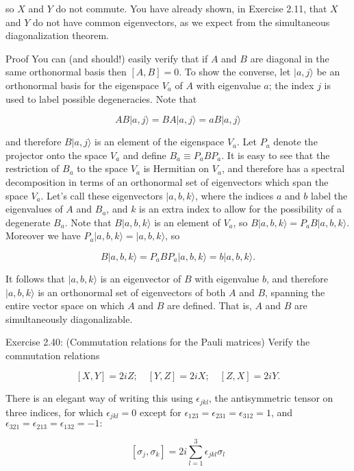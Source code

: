 \documentclass[
	11pt, %
	fleqn, %
	a4paper, %
]{LegrandOrangeBook}
\begin{document}
so $X$ and $Y$ do not commute. You have already shown, in Exercise 2.11, that $X$ and $Y$ do not have common eigenvectors, as we expect from the simultaneous diagonalization theorem.

Proof
You can (and should!) easily verify that if $A$ and $B$ are diagonal in the same orthonormal basis then $[A, B]=0$. To show the converse, let $|a, j\rangle$ be an orthonormal basis for the eigenspace $V_{a}$ of $A$ with eigenvalue $a$; the index $j$ is used to label possible degeneracies. Note that

$$
A B|a, j\rangle=B A|a, j\rangle=a B|a, j\rangle
$$

and therefore $B|a, j\rangle$ is an element of the eigenspace $V_{a}$. Let $P_{a}$ denote the projector onto the space $V_{a}$ and define $B_{a} \equiv P_{a} B P_{a}$. It is easy to see that the restriction of $B_{a}$ to the space $V_{a}$ is Hermitian on $V_{a}$, and therefore has a spectral decomposition in terms of an orthonormal set of eigenvectors which span the space $V_{a}$. Let's call these eigenvectors $|a, b, k\rangle$, where the indices $a$ and $b$ label the eigenvalues of $A$ and $B_{a}$, and $k$ is an extra index to allow for the possibility of a degenerate $B_{a}$. Note that $B|a, b, k\rangle$ is an element of $V_{a}$, so $B|a, b, k\rangle=P_{a} B|a, b, k\rangle$. Moreover we have $P_{a}|a, b, k\rangle=|a, b, k\rangle$, so

$$
B|a, b, k\rangle=P_{a} B P_{a}|a, b, k\rangle=b|a, b, k\rangle .
$$

It follows that $|a, b, k\rangle$ is an eigenvector of $B$ with eigenvalue $b$, and therefore $|a, b, k\rangle$ is an orthonormal set of eigenvectors of both $A$ and $B$, spanning the entire vector space on which $A$ and $B$ are defined. That is, $A$ and $B$ are simultaneously diagonalizable.

Exercise 2.40: (Commutation relations for the Pauli matrices) Verify the commutation relations

$$
[X, Y]=2 i Z ; \quad[Y, Z]=2 i X ; \quad[Z, X]=2 i Y .
$$

There is an elegant way of writing this using $\epsilon_{j k l}$, the antisymmetric tensor on\\
three indices, for which $\epsilon_{j k l}=0$ except for $\epsilon_{123}=\epsilon_{231}=\epsilon_{312}=1$, and $\epsilon_{321}=\epsilon_{213}=\epsilon_{132}=-1:$

$$
\left[\sigma_{j}, \sigma_{k}\right]=2 i \sum_{l=1}^{3} \epsilon_{j k l} \sigma_{l}
$$
\end{document}
